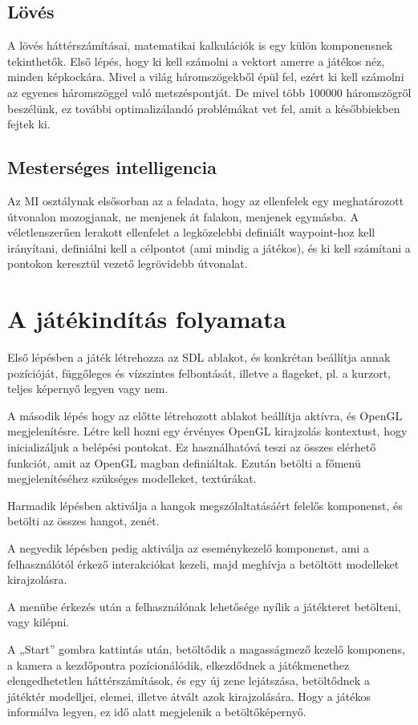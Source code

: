 \subsection{Lövés}

A lövés háttérszámításai, matematikai kalkulációk is egy külön komponensnek tekinthetők. Első lépés, hogy ki kell számolni a vektort amerre a játékos néz, minden képkockára. Mivel a világ háromszögekből épül fel, ezért ki kell számolni az egyenes háromszöggel való metszéspontját. De mivel több 100000 háromszögről beszélünk, ez további optimalizálandó problémákat vet fel, amit a későbbiekben fejtek ki.

\subsection{Mesterséges intelligencia}

Az MI osztálynak elsősorban az a feladata, hogy az ellenfelek egy meghatározott útvonalon mozogjanak, ne menjenek át falakon, menjenek egymásba. A véletlenszerűen lerakott ellenfelet a legközelebbi definiált waypoint-hoz kell irányítani, definiálni kell a célpontot (ami mindig a játékos), és ki kell számítani a pontokon keresztül vezető legrövidebb útvonalat.

\section{A játékindítás folyamata}

Első lépésben a játék létrehozza az SDL ablakot, és konkrétan beállítja annak pozícióját, függőleges és vízszintes felbontását, illetve a flageket, pl. a kurzort, teljes képernyő legyen vagy nem.

A második lépés hogy az előtte létrehozott ablakot beállítja aktívra, és OpenGL megjelenítésre. Létre kell hozni egy érvényes OpenGL  kirajzolás kontextust, hogy inicializáljuk a belépési pontokat. Ez használhatóvá teszi az összes elérhető funkciót, amit az OpenGL magban definiáltak. Ezután betölti a főmenü megjelenítéséhez szükséges modelleket, textúrákat.

Harmadik lépésben aktiválja a hangok megszólaltatásáért felelős komponenst, és betölti az összes hangot, zenét.

A negyedik lépésben pedig aktiválja az eseménykezelő komponenst, ami a felhasználótól érkező interakciókat kezeli, majd meghívja a betöltött modelleket kirajzolásra.

A menübe érkezés után a felhasználónak lehetősége nyílik a játékteret betölteni, vagy kilépni. 

A „Start” gombra kattintás után, betöltődik a magasságmező kezelő komponens, a kamera a kezdőpontra pozícionálódik, elkezdődnek a játékmenethez elengedhetetlen háttérszámítások, és egy új zene lejátszása, betöltődnek a játéktér modelljei, elemei, illetve átvált azok kirajzolására. Hogy a játékos informálva legyen, ez idő alatt megjelenik a betöltőképernyő.

